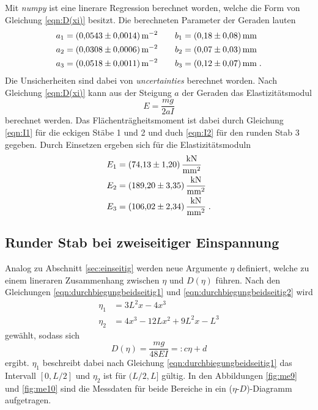 \noindent Mit \textit{numpy}
\cite{numpy} ist eine linerare Regression berechnet worden, welche die Form von Gleichung \eqref{eqn:D(xi)} besitzt. Die berechneten
Parameter der Geraden lauten
\begin{align*}
    a_1&=\SI[per-mode=reciprocal]{0.0543 \pm 0.0014}{\per\square\metre} \qquad
    b_1=\SI{0.18   \pm 0.08}{\milli\metre}      \\
    a_2&=\SI[per-mode=reciprocal]{0.0308 \pm 0.0006}{\per\square\metre} \qquad
    b_2=\SI{0.07  \pm 0.03}  {\milli\metre}       \\
    a_3&=\SI[per-mode=reciprocal]{0.0518 \pm 0.0011}{\per\square\metre} \qquad
    b_3=\SI{0.12   \pm 0.07}   {\milli\metre}         \;.
\end{align*}
Die Unsicherheiten sind dabei von \textit{uncertainties} \cite{uncertainties} berechnet worden.
Nach Gleichung \eqref{eqn:D(xi)} kann aus der Steigung $a$ der Geraden das Elastizitätsmodul
\begin{equation}
    E=\frac{mg}{2aI}
    \label{eqn:E}
\end{equation}
berechnet werden. Das Flächenträgheitsmoment ist dabei durch Gleichung \eqref{eqn:I1} für die eckigen Stäbe 1 und 2 und duch \eqref{eqn:I2}
für den runden Stab 3 gegeben. Durch Einsetzen ergeben sich für die Elastizitätsmoduln
\begin{align*}
    E_1&=\SI{ 74.13 \pm 1.20}{\kilo\newton\per\square\milli\metre}\\
    E_2&=\SI{189.20 \pm 3.35}{\kilo\newton\per\square\milli\metre}\\
    E_3&=\SI{106.02 \pm 2.34}{\kilo\newton\per\square\milli\metre} \;.
\end{align*}

\subsection{Runder Stab bei zweiseitiger Einspannung}
\label{sec:zweiseitig}
Analog zu Abschnitt \ref{sec:einseitig} werden neue Argumente $\eta$ definiert, welche zu einem lineraren Zusammenhang zwischen
$\eta$ und $D(\eta)$ führen. Nach den Gleichungen \eqref{eqn:durchbiegungbeidseitig1} und \eqref{eqn:durchbiegungbeidseitig2} wird
\begin{align*}
    \eta_1&=3L^2x-4x^3 \\
    \eta_2&=4x^3-12Lx^2+9L^2x-L^3
\end{align*}
gewählt, sodass sich
\begin{equation}
    D(\eta)=\frac{mg}{48EI}=:c\eta+d
\end{equation}
ergibt. $\eta_1$ beschreibt dabei nach Gleichung \eqref{eqn:durchbiegungbeidseitig1} das Intervall $[0,L/2]$ und $\eta_2$ ist für $(L/2,L]$ gültig. In den Abbildungen
\ref{fig:me9} und \ref{fig:me10} sind die Messdaten für beide Bereiche in ein ($\eta$-$D$)-Diagramm aufgetragen.

